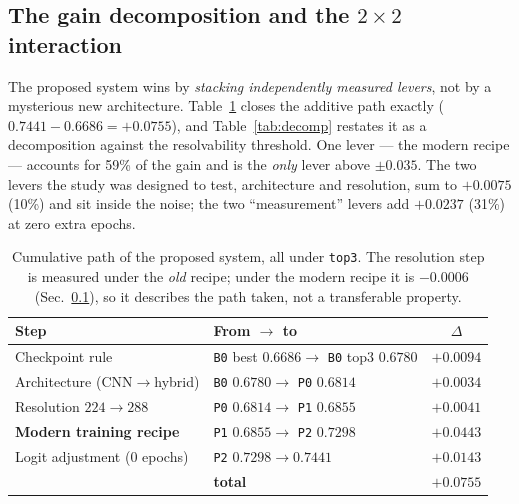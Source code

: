 \documentclass[11pt,a4paper]{article}
\begin{document}
\subsection{The gain decomposition and the \texorpdfstring{$2{\times}2$}{2x2} interaction}
\label{sec:decomp}
The proposed system wins by \emph{stacking independently measured levers}, not by
a mysterious new architecture. Table~\ref{tab:cumulative} closes the additive
path exactly ($0.7441-0.6686=+0.0755$), and Table~\ref{tab:decomp} restates it
as a decomposition against the resolvability threshold. One lever --- the modern
recipe --- accounts for 59\% of the gain and is the \emph{only} lever above
$\pm0.035$. The two levers the study was designed to test, architecture and
resolution, sum to $+0.0075$ (10\%) and sit inside the noise; the two
``measurement'' levers add $+0.0237$ (31\%) at zero extra epochs.

\begin{table}[t]
\centering
\caption{Cumulative path of the proposed system, all under \texttt{top3}. The
resolution step is measured under the \emph{old} recipe; under the modern recipe
it is $-0.0006$ (Sec.~\ref{sec:decomp}), so it describes the path taken, not a
transferable property.}
\label{tab:cumulative}
\begin{tabular}{l l c}
\toprule
Step & From $\to$ to & $\Delta$ \\
\midrule
Checkpoint rule & \texttt{B0} best $0.6686\to$ \texttt{B0} top3 $0.6780$ & $+0.0094$ \\
Architecture (CNN$\to$hybrid) & \texttt{B0} $0.6780\to$ \texttt{P0} $0.6814$ & $+0.0034$ \\
Resolution $224\to288$ & \texttt{P0} $0.6814\to$ \texttt{P1} $0.6855$ & $+0.0041$ \\
\textbf{Modern training recipe} & \texttt{P1} $0.6855\to$ \texttt{P2} $0.7298$ & $\mathbf{+0.0443}$ \\
Logit adjustment (0 epochs) & \texttt{P2} $0.7298\to 0.7441$ & $+0.0143$ \\
\midrule
& \textbf{total} & $\mathbf{+0.0755}$ \\
\bottomrule
\end{tabular}
\end{table}
\end{document}
